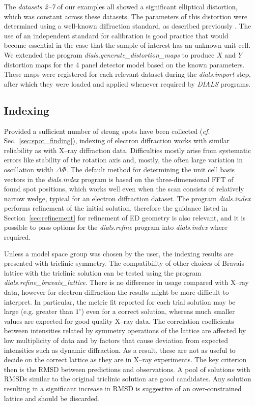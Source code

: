 \documentclass[preprint]{iucr}
\newcommand{\dials}{\emph{DIALS}\xspace}
\newcommand{\dialsimport}{\emph{dials.import}\xspace}
\newcommand{\dialsindex}{\emph{dials.index}\xspace}
\newcommand{\dialsrefinebravaislattice}{\emph{dials.refine\_bravais\_lattice}\xspace}
\newcommand{\dialsrefine}{\emph{dials.refine}\xspace}
\begin{document}
The \emph{datasets 2--7} of our examples all showed a significant elliptical
distortion, which was constant across these datasets.
The parameters of this distortion were determined using a well-known
diffraction standard, as described previously \cite{Clabbers2017}. The use of an
independent standard for calibration is good practice that would become essential
in the case that the sample of interest has an unknown unit cell. We extended
the program \emph{dials.generate\_distortion\_maps}
to produce $X$ and $Y$ distortion maps for the 4 panel detector model based on
the known parameters. These maps were registered for each relevant dataset
during the \dialsimport step, after which they were loaded and applied
whenever required by \dials programs.

\subsection{Indexing}

Provided a sufficient number of strong spots have been collected (\emph{cf.}
Sec.~\ref{sec:spot_finding}), indexing of electron diffraction works with
similar reliability as with X--ray diffraction data. Difficulties mostly arise
from systematic errors like stability of the rotation axis and, mostly, the
often large variation in oscillation width $\Delta \Phi$. The default method
for determining the unit cell basis vectors in the \dialsindex program is
based on the three-dimensional FFT of found spot positions, which works well
even when the scan consists of relatively narrow wedge, typical for an electron
diffraction dataset. The program \dialsindex performs refinement of the initial
solution, therefore the guidance listed in Section~\ref{sec:refinement} for
refinement of ED geometry is also relevant, and it is possible to pass
options for the \dialsrefine program into \dialsindex where required.

Unless a model space group was chosen by the user, the indexing results are
presented with triclinic symmetry. The compatibility of other choices of
Bravais lattice with the triclinic solution can be tested using the program
\dialsrefinebravaislattice \cite{Winter2018,Sauter2006}. There is no difference
in usage compared with X--ray data, however for electron diffraction the
results might be more difficult to interpret. In particular, the metric fit
reported for each trial solution \cite{LePage1982} may be large (e.g. greater
than $1^\circ$) even for a correct solution, whereas much smaller values are
expected for good quality X--ray data. The correlation coefficients between
intensities related by symmetry operations of the lattice are affected by low
multiplicity of data and by factors that cause deviation from expected intensities
such as dynamic diffraction. As a result, these are not as useful to decide
on the correct lattice as they are in X--ray experiments. The key criterion then
is the RMSD between predictions and observations. A pool of solutions with
RMSDs similar to the original triclinic solution are good candidates. Any
solution resulting in a significant increase in RMSD is suggestive of an
over-constrained lattice and should be discarded.
\end{document}
